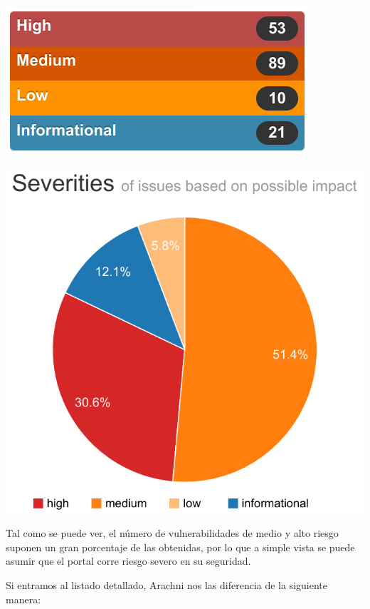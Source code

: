 \documentclass{\ClassPath/viu-tfm-template}
\begin{document}
{
    \hfill
    \begin{minipage}{0.4\linewidth}
        \includegraphics[width=\linewidth]{img/total.png}
    \end{minipage}
    \hfill
    \hfill
    \begin{minipage}{0.3\linewidth}
        \includegraphics[width=\linewidth]{img/grafico.png}
    \end{minipage}
    \hfill
}

Tal como se puede ver, el número de vulnerabilidades de medio y alto riesgo suponen un gran porcentaje de las obtenidas, por lo que a simple vista se puede asumir que el portal corre riesgo severo en su seguridad.

Si entramos al listado detallado, Arachni nos las diferencia de la siguiente manera:
\end{document}
